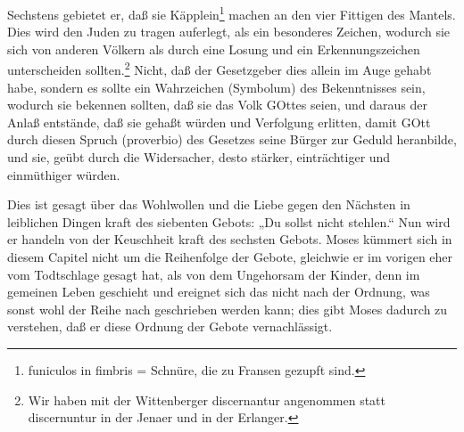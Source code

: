 Sechstens gebietet er, daß sie Käpplein\footnote{funiculos in fimbris = Schnüre, die zu Fransen gezupft sind.} machen an den vier Fittigen des Mantels. Dies wird den Juden zu tragen auferlegt, als ein besonderes Zeichen, wodurch sie sich von anderen Völkern als durch eine Losung und ein Erkennungszeichen unterscheiden sollten.\footnote{Wir haben mit der Wittenberger discernantur angenommen statt discernuntur in der Jenaer und in der Erlanger.} Nicht, daß der Gesetzgeber dies allein im Auge gehabt habe, sondern es sollte ein Wahrzeichen (Symbolum) des Bekenntnisses sein, wodurch sie bekennen sollten, daß sie das Volk GOttes seien, und daraus der Anlaß entstände, daß sie gehaßt würden und Verfolgung erlitten, damit GOtt durch diesen Spruch (proverbio) des Gesetzes seine Bürger zur Geduld heranbilde, und sie, geübt durch die Widersacher, desto stärker, einträchtiger und einmüthiger würden.

Dies ist gesagt über das Wohlwollen und die Liebe gegen den Nächsten in leiblichen Dingen kraft des siebenten Gebots: „Du sollst nicht stehlen.“ Nun wird er handeln von der Keuschheit kraft des sechsten Gebots. Moses kümmert sich in diesem Capitel nicht um die Reihenfolge der Gebote, gleichwie er im vorigen eher vom Todtschlage gesagt hat, als von dem Ungehorsam der Kinder, denn im gemeinen Leben geschieht und ereignet sich das nicht nach der Ordnung, was sonst wohl der Reihe nach geschrieben werden kann; dies gibt Moses dadurch zu verstehen, daß er diese Ordnung der Gebote vernachlässigt.

